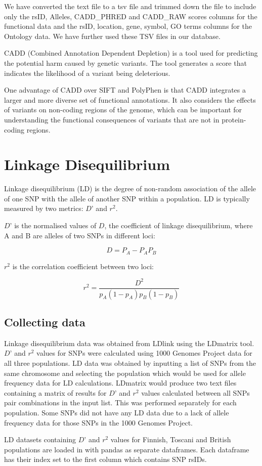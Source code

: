 \documentclass[12pt,a4paper]{article}
\newcommand{\sect}[1]{
\hypertarget{#1}{
\section{#1}\label{#1}}
}
\newcommand{\subsect}[1]{
\hypertarget{#1}{
\subsection{#1}\label{#1}}
}
\begin{document}
We have converted the text file to a tsv file and trimmed down the file to include only the rsID, Alleles, CADD\_PHRED and CADD\_RAW scores columns for the functional data and the rsID, location, gene, symbol, GO terms columns for the Ontology data. We have further used these TSV files in our database.

CADD (Combined Annotation Dependent Depletion) is a tool used for predicting the potential harm caused by genetic variants. The tool generates a score that indicates the likelihood of a variant being deleterious.

One advantage of CADD over SIFT and PolyPhen is that CADD integrates a larger and more diverse set of functional annotations. It also considers the effects of variants on non-coding regions of the genome, which can be important for understanding the functional consequences of variants that are not in protein-coding regions.

\sect {Linkage Disequilibrium}

Linkage disequilibrium (LD) is the degree of non-random association of the allele of one SNP with the allele of another SNP within a population. LD is typically measured by two metrics: $D’$ and $r^2$.

$D’$ is the normalised values of $D$, the coefficient of linkage disequilibrium, where A and B are alleles of two SNPs in different loci:

\[D=P_A -  P_A P_B\]

$r^2$  is the correlation coefficient between two loci:

\[r^2 = \frac{D^2}{p_A(1-p_A)p_B(1-p_B)} \]


\subsect{Collecting data}

Linkage disequilibrium data was obtained from LDlink using the LDmatrix tool. $D’$ and $r^2$ values for SNPs were calculated using 1000 Genomes Project data for all three populations. LD data was obtained by inputting a list of SNPs from the same chromosome and selecting the population which would be used for allele frequency data for LD calculations. LDmatrix would produce two text files containing a matrix of results for $D’$ and $r^2$ values calculated between all SNPs pair combinations in the input list. This was performed separately for each population. Some SNPs did not have any LD data due to a lack of allele frequency data for those SNPs in the 1000 Genomes Project.

LD datasets containing $D’$ and $r^2$  values for Finnish, Toscani and British populations are loaded in with pandas as separate dataframes. Each dataframe has their index set to the first column which contains SNP rsIDs.
\inputminted{python}{code_snippets/placeholder.py}
\end{document}
